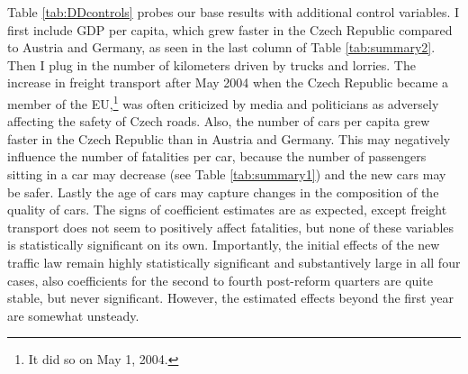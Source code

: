 \documentclass[12pt]{article}
\begin{document}
\begin{table}[t] 
  \footnotesize  
\end{table}

Table \ref{tab:DDcontrols} probes our base results with additional control
variables. I first include GDP per capita, which grew faster in the Czech
Republic compared to Austria and Germany, as seen in the last column of Table
\ref{tab:summary2}. Then I plug in the number of kilometers driven by trucks and
lorries. The increase in freight transport after May 2004 when the Czech
Republic became a member of the EU,\footnote{It did so on May 1, 2004.} was
often criticized by media and politicians as adversely affecting the safety of
Czech roads. Also, the number of cars per capita grew faster in the Czech
Republic than in Austria and Germany.  This may negatively influence the number
of fatalities per car, because the number of passengers sitting in a car may
decrease (see Table \ref{tab:summary1}) and the new cars may be safer. Lastly
the age of cars may capture changes in the composition of the quality of cars.
The signs of coefficient estimates are as expected, except freight transport
does not seem to positively affect fatalities, but none of these variables is
statistically significant on its own. Importantly, the initial effects of the
new traffic law remain highly statistically significant and substantively large
in all four cases, also coefficients for the second to fourth post-reform
quarters are quite stable, but never significant. However, the estimated effects
beyond the first year are somewhat unsteady.
\end{document}
